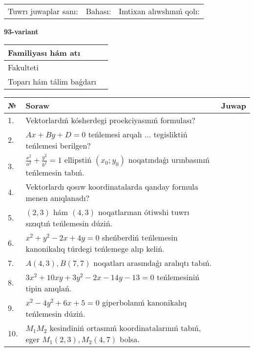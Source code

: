 \documentclass{article}
\begin{document}
\vspace{1cm}

\begin{tabular}{lll}
Tuwrı juwaplar sanı: \underline{\hspace{1.5cm}} & 
Bahası: \underline{\hspace{1.5cm}} & 
Imtixan alıwshınıń qolı: \underline{\hspace{2cm}} \\
\end{tabular}

\egroup

\newpage


\textbf{93-variant}\\

\bgroup
\def\arraystretch{1.6} %

\begin{tabular}{|m{5.7cm}|m{9.5cm}|}
\hline
Familiyası hám atı & \\
\hline
Fakulteti  & \\
\hline
Toparı hám tálim baǵdarı  & \\
\hline
\end{tabular}

\vspace{1cm}

\begin{tabular}{|m{0.7cm}|m{10cm}|m{4cm}|}
\hline
№ & Soraw & Juwap \\
\hline
1. & Vektorlardıń kósherdegi proekciyasınıń formulası? &  \\
\hline
2. & $Ax+By+D=0$ teńlemesi arqalı ... tegisliktiń teńlemesi berilgen? &  \\
\hline
3. & $\frac{x^2}{a^2}+\frac{y^2}{b^2}=1$ ellipstiń $(x_0;y_0)$ noqatındaǵı urınbasınıń teńlemesin tabıń. &  \\
\hline
4. & Vektorlardı qosıw koordinatalarda qanday formula menen anıqlanadı? &  \\
\hline
5. & $(2, 3)$ hám $(4, 3)$ noqatlarınan ótiwshi tuwrı sızıqtıń teńlemesin dúziń. &  \\
\hline
6. & $x^{2}+y^{2}-2x+4y=0$ sheńberdiń teńlemesin kanonikalıq túrdegi teńlemege alıp keliń. &  \\
\hline
7. & $A(4, 3), B(7, 7)$ noqatları arasındaǵı aralıqtı tabıń. &  \\
\hline
8. & $3x^{2}+10xy+3y^{2}-2x-14y-13=0$ teńlemesiniń tipin anıqlań. &  \\
\hline
9. & $x^{2}-4y^{2}+6x+5=0$ giperbolanıń kanonikalıq teńlemesin dúziń. &  \\
\hline
10. & $M_{1}M_{2}$ kesindiniń ortasınıń koordinatalarınıń tabıń, eger $M_{1} (2, 3), M_{2} (4, 7)$ bolsa. &  \\
\hline
\end{tabular}
\end{document}
